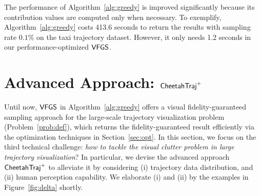 
%
%
The performance of Algorithm~\ref{alg:greedy} is improved significantly because its contribution values are computed only when necessary.
To exemplify, Algorithm~\ref{alg:greedy} costs 413.6 seconds to return the results with sampling rate $0.1\%$ on the \pt{} taxi trajectory dataset.
However, it only needs 1.2 seconds in our performance-optimized $\mathsf{VFGS}$.


\section{Advanced Approach: $\mathsf{CheetahTraj}^{+}$}\label{sec:aa}
Until now, $\mathsf{VFGS}$ in Algorithm~\ref{alg:greedy} offers a visual fidelity-guaranteed sampling approach for the large-scale trajectory visualization problem (Problem~\ref{prob:def}),
which returns the fidelity-guaranteed result efficiently via the optimization techniques in Section~\ref{sec:opt}.
In this section, we focus on the third technical challenge: \emph{how to tackle the visual clutter problem in large trajectory visualization}?
In particular, we devise the advanced approach $\mathsf{CheetahTraj}^{+}$ to alleviate it by considering
(i) trajectory data distribution, and (ii) human perception capability.
We elaborate (i) and (ii) by the examples in Figure~\ref{fig:delta} shortly.


